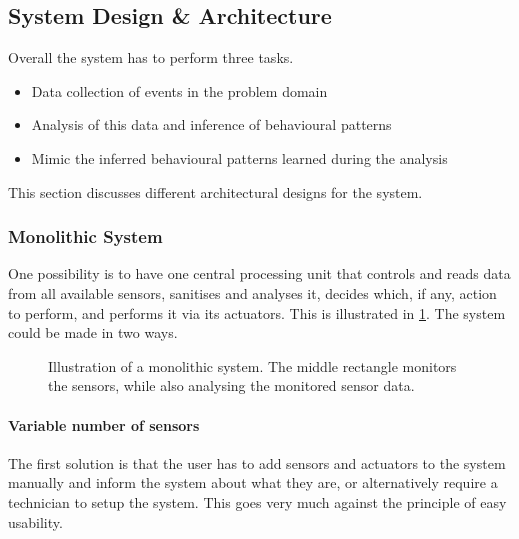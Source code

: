 \subsection{System Design \& Architecture}\label{sub:systemDesignArchitecture}

Overall the system has to perform three tasks.

\begin{itemize}
\item Data collection of events in the problem domain
\item Analysis of this data and inference of behavioural patterns
\item Mimic the inferred behavioural patterns learned during the analysis
\end{itemize}
This section discusses different architectural designs for the system. 

\subsubsection{Monolithic System} 
One possibility is to have one central processing unit that controls and reads data  from all available sensors, sanitises and analyses it, decides which, if any, action to perform, and performs it via its actuators. This is illustrated in \cref{fig:monolithic_system}. The system could be made in two ways.

\begin{figure}[htbp]
\centering
{}
\caption{Illustration of a monolithic system. The middle rectangle monitors the sensors, while also analysing the monitored sensor data.}\label{fig:monolithic_system}
\end{figure}

\paragraph{Variable number of sensors}
The first solution is that the user has to add sensors and actuators to the system manually and inform the system about what they are, or alternatively require a technician to setup the system. This goes very much against the principle of easy usability. 

